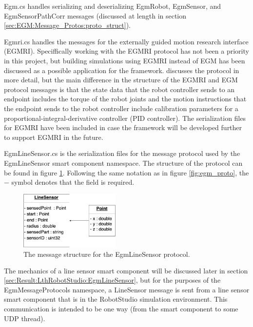\documentclass{cslthse-msc}
\begin{document}
Egm.cs handles serializing and deserializing EgmRobot, EgmSensor, and EgmSensorPathCorr messages (discussed at length in section \ref{sec:EGM:Message_Protos:proto_struct}). \par

Egmri.cs handles the messages for the externally guided motion research interface (EGMRI). Speciffically working with the EGMRI protocol has not been a priority in this project, but building simulations using EGMRI instead of EGM  has been discussed as a possible application for the framework. \cite{LU:egmri} discusses the protocol in more detail, but the main difference in the structure of the EGMRI and EGM protocol messages is that the state data that the robot controller sends to an endpoint includes the torque of the robot joints and the motion instructions that the endpoint sends to the robot controller include calibration parameters for a proportional-integral-derivative controller (PID controller). The serialization files for EGMRI have been included in case the framework will be developed further to support EGMRI in the future. \par

EgmLineSensor.cs is the serialization files for the message protocol used by the EgmLineSensor smart component namespace. The structure of the protocol can be found in figure \ref{fig:EgmLineSensorProto}. Following the same notation as in figure \ref{fig:egm_proto}, the $-$ symbol denotes that the field is required. 
\begin{figure}[H]
    \centering
    \includegraphics[width=5cm]{EgmLineSensorProto.jpg}
    \caption{The message structure for the EgmLineSensor protocol.}
    \label{fig:EgmLineSensorProto}
\end{figure}
The mechanics of a line sensor smart component will be discussed later in section \ref{sec:Result:LthRobotStudio:EgmLineSensor}, but for the purposes of the EgmMessageProtocols namespace, a LineSensor message is sent from a line sensor smart component that is in the RobotStudio simulation environment. This communication is intended to be one way (from the smart component to some UDP thread).
\end{document}
